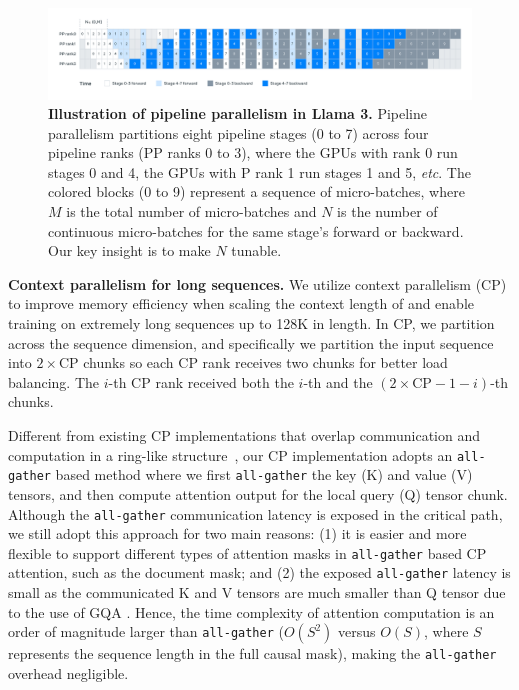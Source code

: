 \begin{figure}[t]
     \centering
     \includegraphics[width=\textwidth]{assets/pipeline_parallelism.pdf}
     \caption{\textbf{Illustration of pipeline parallelism in Llama 3.} Pipeline parallelism partitions eight pipeline stages (0 to 7) across four pipeline ranks (PP ranks 0 to 3), where the GPUs with rank 0 run stages 0 and 4, the GPUs with P rank 1 run stages 1 and 5, \emph{etc}. The colored blocks (0 to 9) represent a sequence of micro-batches, where $M$ is the total number of micro-batches and $N$ is the number of continuous micro-batches for the same stage's forward or backward. Our key insight is to make $N$ tunable.
     }
     \label{fig:pipeline_parallelism}
\end{figure}

\textbf{Context parallelism for long sequences.} We utilize context parallelism (CP) to improve memory efficiency when scaling the context length of \llamathree and enable training on extremely long sequences up to 128K in length. In CP, we partition across the sequence dimension, and specifically we partition the input sequence into $2 \times \mbox{CP}$ chunks so each CP rank receives two chunks for better load balancing. The $i$-th CP rank received both the $i$-th and the $(2 \times \mbox{CP} - 1 - i)$-th chunks. 

Different from existing CP implementations that overlap communication and computation in a ring-like structure~\citep{liu2023ring}, our CP implementation adopts an \texttt{all-gather} based method where we first \texttt{all-gather} the key (K) and value (V) tensors, and then compute attention output for the local query (Q) tensor chunk. Although the \texttt{all-gather} communication latency is exposed in the critical path, we still adopt this approach for two main reasons: (1) it is easier and more flexible to support different types of attention masks in \texttt{all-gather} based CP attention, such as the document mask; and (2) the exposed \texttt{all-gather} latency is small as the communicated K and V tensors are much smaller than Q tensor due to the use of GQA \citep{ainslie2023gqa}. Hence, the time complexity of attention computation is an order of magnitude larger than \texttt{all-gather} ($O(S^2)$ versus $O(S)$, where $S$ represents the sequence length in the full causal mask), making the \texttt{all-gather} overhead negligible.

